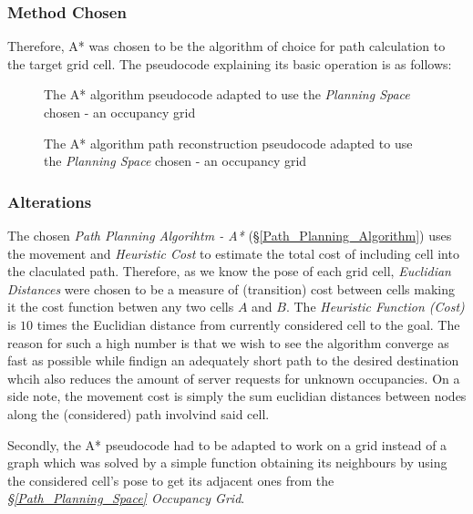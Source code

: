 \documentclass[11pt, a4paper]{article}
\begin{document}
\subsubsection{Method Chosen} 

Therefore, A* was chosen to be the algorithm of choice for path calculation to the target grid cell. The pseudocode explaining its basic operation is as follows:

\begin{figure}[H]
	  \centering 
	  \caption{The A* algorithm pseudocode\cite{path_astar_pseudocode} adapted to use the \textit{Planning Space} chosen - an occupancy grid }
\end{figure} 


\begin{figure}[H]
 	  \centering
          \caption{The A* algorithm path reconstruction pseudocode\cite{path_astar_grid_no_grid} adapted to use the \textit{Planning Space} chosen - an occupancy grid }
\end{figure} 

\subsubsection{Alterations}
\label{Path_Planning_Algorihtm_Alterations}

The chosen \textit{Path Planning Algorihtm - A*} (\S\ref{Path_Planning_Algorithm}) uses the movement and \textit{Heuristic Cost} to estimate the total cost of  including cell into the claculated path. Therefore, as we know the pose of each grid cell, \textit{Euclidian Distances} were chosen to be a measure of (transition) cost between cells making it the cost function betwen any two cells $A$ and $B$. The \textit{Heuristic Function (Cost)} is $10$ times the Euclidian distance from currently considered cell to the goal. The reason for such a high number is that we wish to see the algorithm converge as fast as possible while findign an adequately short path to the desired destination whcih also reduces the amount of server requests for unknown occupancies. On a side note, the movement cost is simply the sum euclidian distances between nodes along the (considered) path involvind said cell.

Secondly, the A* pseudocode had to be adapted to work on a grid instead of a graph which was solved by a simple function obtaining its neighbours by using the considered cell's pose to get its adjacent ones from the \textit{\S\ref{Path_Planning_Space} Occupancy Grid}.
\end{document}
